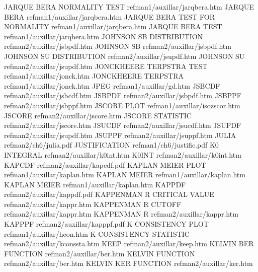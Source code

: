 JARQUE BERA NORMALITY TEST              refman1/auxillar/jarqbera.htm
JARQUE BERA                             refman1/auxillar/jarqbera.htm
JARQUE BERA TEST FOR NORMALITY          refman1/auxillar/jarqbera.htm
JARQUE BERA TEST                        refman1/auxillar/jarqbera.htm
JOHNSON SB DISTRIBUTION                 refman2/auxillar/jsbpdf.htm
JOHNSON SB                              refman2/auxillar/jsbpdf.htm
JOHNSON SU DISTRIBUTION                 refman2/auxillar/jsupdf.htm
JOHNSON SU                              refman2/auxillar/jsupdf.htm
JONCKHEERE TERPSTRA TEST                refman1/auxillar/jonck.htm
JONCKHEERE TERPSTRA                     refman1/auxillar/jonck.htm
JPEG                                    refman1/auxillar/gd.htm
JSBCDF                                  refman2/auxillar/jsbcdf.htm
JSBPDF                                  refman2/auxillar/jsbpdf.htm
JSBPPF                                  refman2/auxillar/jsbppf.htm
JSCORE PLOT                             refman1/auxillar/isozscor.htm
JSCORE                                  refman2/auxillar/jscore.htm
JSCORE STATISTIC                        refman2/auxillar/jscore.htm
JSUCDF                                  refman2/auxillar/jsucdf.htm
JSUPDF                                  refman2/auxillar/jsupdf.htm
JSUPPF                                  refman2/auxillar/jsuppf.htm
JULIA                                   refman2/ch6/julia.pdf
JUSTIFICATION                           refman1/ch6/justific.pdf
K0 INTEGRAL                             refman2/auxillar/k0int.htm
K0INT                                   refman2/auxillar/k0int.htm
KAPCDF                                  refman2/auxillar/kapcdf.pdf
KAPLAN MEIER PLOT                       refman1/auxillar/kaplan.htm
KAPLAN MEIER                            refman1/auxillar/kaplan.htm
KAPLAN MEIER                            refman1/auxillar/kaplan.htm
KAPPDF                                  refman2/auxillar/kappdf.pdf
KAPPENMAN R CRITICAL VALUE              refman2/auxillar/kappr.htm
KAPPENMAN R CUTOFF                      refman2/auxillar/kappr.htm
KAPPENMAN R                             refman2/auxillar/kappr.htm
KAPPPF                                  refman2/auxillar/kapppf.pdf
K CONSISTENCY PLOT                      refman1/auxillar/hcon.htm
K CONSISTENCY STATISTIC                 refman2/auxillar/kconssta.htm
KEEP                                    refman2/auxillar/keep.htm
KELVIN BER FUNCTION                     refman2/auxillar/ber.htm
KELVIN FUNCTION                         refman2/auxillar/ber.htm
KELVIN KER FUNCTION                     refman2/auxillar/ker.htm
